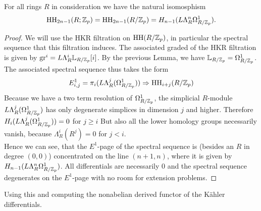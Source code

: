\begin{prop}
    For all rings $R$ in consideration we have the natural isomosphism 
    \begin{equation*}
        \operatorname{HH}_{2n-1}(R;\mathbb{Z}_p)=\operatorname{HH}_{2n-1}(R/\mathbb{Z}_p)=H_{n-1}(L\Lambda^{n}_R \Omega^1_{R/\mathbb{Z}_p}).
    \end{equation*} 
\end{prop}
\begin{proof}
    We will use the HKR filtration on $\operatorname{HH}(R/\mathbb{Z}_p)$, in particular the spectral sequence that this filtration induces. The associated graded of the HKR filtration is given by $\operatorname{gr}^i=L\Lambda^i_R\mathbb{L}_{R/\mathbb{Z}_p}[i]$. By the previous Lemma, we have $\mathbb{L}_{R/\mathbb{Z}_p}=\Omega^1_{R/\mathbb{Z}_p}$.
    The associated spectral sequence thus takes the form
    \begin{equation*}
        E^1_{i,j}=\pi_i(L\Lambda^j_R(\Omega^1_{R/\mathbb{Z}_p}))\Rightarrow \operatorname{HH}_{i+j}(R/\mathbb{Z}_p)
    \end{equation*}
    Because we have a two term resolution of $\Omega^1_{R/\mathbb{Z}_p}$, the simplicial $R$-module $L\Lambda^j_R(\Omega^1_{R/\mathbb{Z}_p})$ has only degenerate simplices in dimension $j$ and higher. Therefore $H_i(L\Lambda^j_R(\Omega^1_{R/\mathbb{Z}_p}))=0$ for $j\geq i$
    But also all the lower homology groups necessarily vanish, because $\Lambda_R^i(R^j)=0$ for $j<i$. \\
    Hence we can see, that the $E^1$-page of the spectral sequence is (besides an $R$ in degree $(0,0)$) concentrated on the line $(n+1,n)$, where it is given by $H_{n-1}(L\Lambda^{n}_R \Omega^1_{R/\mathbb{Z}_p})$.
    All differentials are necessarily 0 and the spectral sequence degenerates on the $E^1$-page with no room for extension problems.
\end{proof}
Using this and computing the nonabelian derived functor of the Kähler differentials.



